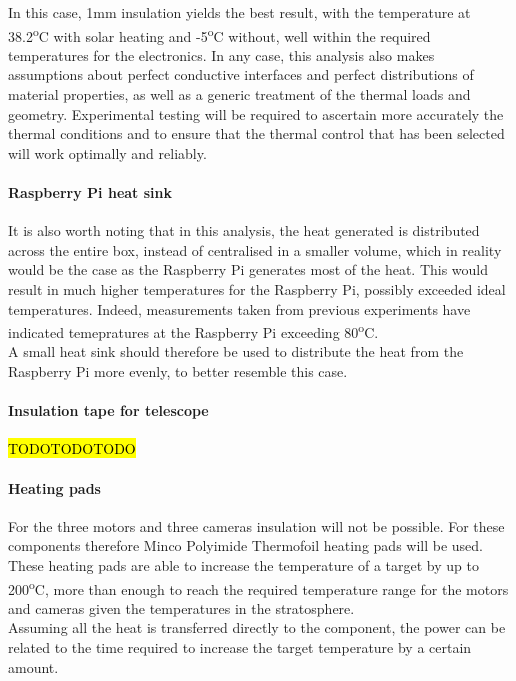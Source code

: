 In this case, 1mm insulation yields the best result, with the temperature at 38.2\textsuperscript{o}C with solar heating and -5\textsuperscript{o}C without, well within the required temperatures for the electronics. In any case, this analysis also makes assumptions about perfect conductive interfaces and perfect distributions of material properties, as well as a generic treatment of the thermal loads and geometry. Experimental testing will be required to ascertain more accurately the thermal conditions and to ensure that the thermal control that has been selected will work optimally and reliably. 


\paragraph{Raspberry Pi heat sink}

It is also worth noting that in this analysis, the heat generated is distributed across the entire box, instead of centralised in a smaller volume, which in reality would be the case as the Raspberry Pi generates most of the heat. This would result in much higher temperatures for the Raspberry Pi, possibly exceeded ideal temperatures. Indeed, measurements taken from previous experiments have indicated temepratures at the Raspberry Pi exceeding 80\textsuperscript{o}C. \\

A small heat sink should therefore be used to distribute the heat from the Raspberry Pi more evenly, to better resemble this case. 

\paragraph{Insulation tape for telescope}
\hl{TODOTODOTODO}


\paragraph{Heating pads}
For the three motors and three cameras insulation will not be possible. For these components therefore Minco Polyimide Thermofoil heating pads will be used. These heating pads are able to increase the temperature of a target by up to 200\textsuperscript{o}C, more than enough to reach the required temperature range for the motors and cameras given the temperatures in the stratosphere.\\

Assuming all the heat is transferred directly to the component, the power can be related to the time required to increase the target temperature by a certain amount.

